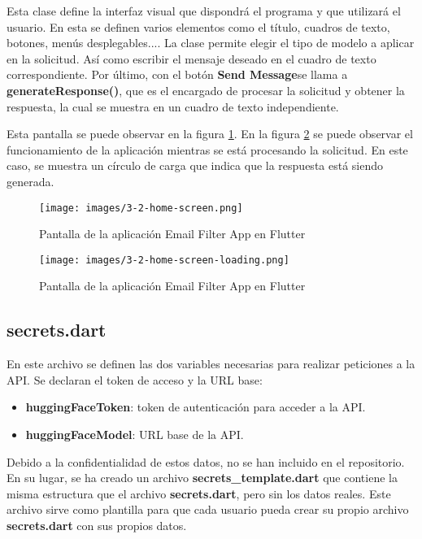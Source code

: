 \documentclass[12pt]{article}
\begin{document}
Esta clase define la interfaz visual que dispondrá el programa y que utilizará el usuario. En esta se definen varios elementos como el título, cuadros de texto, botones, menús desplegables.... La clase permite elegir el tipo de modelo a aplicar en la solicitud. Así como escribir el mensaje deseado en el cuadro de texto correspondiente. Por último, con el botón \textbf{Send Message}se llama a \textbf{generateResponse()}, que es el encargado de procesar la solicitud y obtener la respuesta, la cual se muestra en un cuadro de texto independiente.

Esta pantalla se puede observar en la figura \ref{fig:3-2-home-screen}.
En la figura \ref{fig:3-2-home-screen-loading} se puede observar el funcionamiento de la aplicación mientras se está procesando la solicitud. En este caso, se muestra un círculo de carga que indica que la respuesta está siendo generada.

\begin{figure}[H]
    \centering
    \texttt{[image: images/3-2-home-screen.png]}
    \caption{Pantalla de la aplicación Email Filter App en Flutter}
    \label{fig:3-2-home-screen}
\end{figure}

\begin{figure}[H]
    \centering
    \texttt{[image: images/3-2-home-screen-loading.png]}
    \caption{Pantalla de la aplicación Email Filter App en Flutter}
    \label{fig:3-2-home-screen-loading}
\end{figure}

\subsection{secrets.dart}

En este archivo se definen las dos variables necesarias para realizar peticiones a la API. Se declaran el token de acceso y la URL base:

\begin{itemize}
    \item \textbf{huggingFaceToken}: token de autenticación para acceder a la API.
    \item \textbf{huggingFaceModel}: URL base de la API.
\end{itemize}

Debido a la confidentialidad de estos datos, no se han incluido en el repositorio. En su lugar, se ha creado un archivo \textbf{secrets\_template.dart} que contiene la misma estructura que el archivo \textbf{secrets.dart}, pero sin los datos reales. Este archivo sirve como plantilla para que cada usuario pueda crear su propio archivo \textbf{secrets.dart} con sus propios datos.
\end{document}

